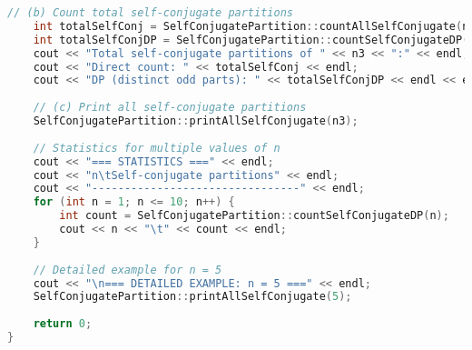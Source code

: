 \documentclass[12pt,a4paper]{article}
\theoremstyle{definition}
\begin{document}
\begin{lstlisting}[language=C++, caption=Chương trình C++ hoàn chỉnh cho bài 2 \& 3]
    // (b) Count total self-conjugate partitions
    int totalSelfConj = SelfConjugatePartition::countAllSelfConjugate(n3);
    int totalSelfConjDP = SelfConjugatePartition::countSelfConjugateDP(n3);
    cout << "Total self-conjugate partitions of " << n3 << ":" << endl;
    cout << "Direct count: " << totalSelfConj << endl;
    cout << "DP (distinct odd parts): " << totalSelfConjDP << endl << endl;
    
    // (c) Print all self-conjugate partitions
    SelfConjugatePartition::printAllSelfConjugate(n3);
    
    // Statistics for multiple values of n
    cout << "=== STATISTICS ===" << endl;
    cout << "n\tSelf-conjugate partitions" << endl;
    cout << "--------------------------------" << endl;
    for (int n = 1; n <= 10; n++) {
        int count = SelfConjugatePartition::countSelfConjugateDP(n);
        cout << n << "\t" << count << endl;
    }
    
    // Detailed example for n = 5
    cout << "\n=== DETAILED EXAMPLE: n = 5 ===" << endl;
    SelfConjugatePartition::printAllSelfConjugate(5);
    
    return 0;
}
\end{lstlisting}
\end{document}
